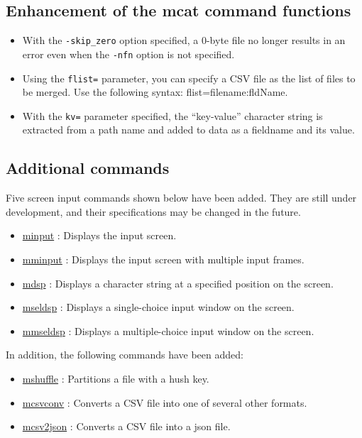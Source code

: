 \subsection{Enhancement of the mcat command functions}
\begin{itemize}
 \item With the \verb|-skip_zero| option specified, a 0-byte file no longer results in an error even when the \verb|-nfn| option is not specified.
 \item Using the \verb|flist=| parameter, you can specify a CSV file as the list of files to be merged. Use the following syntax: flist=filename:fldName.
 \item With the \verb|kv=| parameter specified, the “key-value” character string is extracted from a path name and added to data as a fieldname and its value.
\end{itemize}

\subsection{Additional commands}
Five screen input commands shown below have been added. They are still under development, and their specifications may be changed in the future.
\begin{itemize}
\item \hyperref[sect:minput] {minput} : Displays the input screen.
\item \hyperref[sect:mminput] {mminput} : Displays the input screen with multiple input frames.
\item \hyperref[sect:mdsp] {mdsp} : Displays a character string at a specified position on the screen.
\item \hyperref[sect:mseldsp] {mseldsp} : Displays a single-choice input window on the screen. 
\item \hyperref[sect:mmseldsp] {mmseldsp} : Displays a multiple-choice input window on the screen.
\end{itemize}

In addition, the following commands have been added:
\begin{itemize}
\item \hyperref[sect:mshuffle] {mshuffle} : Partitions a file with a hush key.
\item \hyperref[sect:mcsvconv] {mcsvconv} : Converts a CSV file into one of several other formats.
\item \hyperref[sect:mcsv2json] {mcsv2json} : Converts a CSV file into a json file.
\end{itemize}

%
